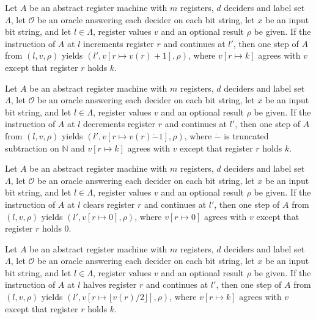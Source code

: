 \begin{lemma}
\label{Complexity.LogProg.astep_inc}
\leanok
{}
Let $A$ be an abstract register machine with $m$ registers, $d$ deciders and label set
$\Lambda$, let $\mathcal{O}$ be an oracle answering each decider on each bit string, let
$x$ be an input bit string, and let $l\in\Lambda$, register values $v$ and an optional
result $\rho$ be given. If the instruction of $A$ at $l$ increments register $r$ and
continues at $l'$, then one step of $A$ from $(l,v,\rho)$ yields
$(l', v[r\mapsto v(r)+1], \rho)$, where $v[r\mapsto k]$ agrees with $v$ except that
register $r$ holds $k$.
\end{lemma}

\begin{lemma}
\label{Complexity.LogProg.astep_dec}
\leanok
{}
Let $A$ be an abstract register machine with $m$ registers, $d$ deciders and label set
$\Lambda$, let $\mathcal{O}$ be an oracle answering each decider on each bit string, let
$x$ be an input bit string, and let $l\in\Lambda$, register values $v$ and an optional
result $\rho$ be given. If the instruction of $A$ at $l$ decrements register $r$ and
continues at $l'$, then one step of $A$ from $(l,v,\rho)$ yields
$(l', v[r\mapsto v(r)\dot{-}1], \rho)$, where $\dot{-}$ is truncated subtraction on
$\mathbb{N}$ and $v[r\mapsto k]$ agrees with $v$ except that register $r$ holds $k$.
\end{lemma}

\begin{lemma}
\label{Complexity.LogProg.astep_clr}
\leanok
{}
Let $A$ be an abstract register machine with $m$ registers, $d$ deciders and label set
$\Lambda$, let $\mathcal{O}$ be an oracle answering each decider on each bit string, let
$x$ be an input bit string, and let $l\in\Lambda$, register values $v$ and an optional
result $\rho$ be given. If the instruction of $A$ at $l$ clears register $r$ and
continues at $l'$, then one step of $A$ from $(l,v,\rho)$ yields
$(l', v[r\mapsto 0], \rho)$, where $v[r\mapsto 0]$ agrees with $v$ except that register
$r$ holds $0$.
\end{lemma}

\begin{lemma}
\label{Complexity.LogProg.astep_half}
\leanok
{}
Let $A$ be an abstract register machine with $m$ registers, $d$ deciders and label set
$\Lambda$, let $\mathcal{O}$ be an oracle answering each decider on each bit string, let
$x$ be an input bit string, and let $l\in\Lambda$, register values $v$ and an optional
result $\rho$ be given. If the instruction of $A$ at $l$ halves register $r$ and
continues at $l'$, then one step of $A$ from $(l,v,\rho)$ yields
$(l', v[r\mapsto \lfloor v(r)/2\rfloor], \rho)$, where $v[r\mapsto k]$ agrees with $v$
except that register $r$ holds $k$.
\end{lemma}

